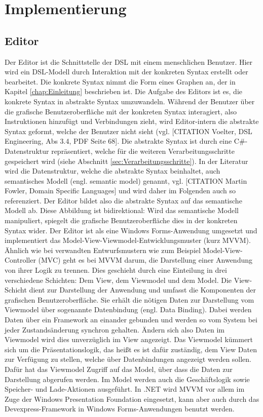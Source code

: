 \chapter{Implementierung}
\label{chap:Implementierung}

\section{Editor}
\label{sec:Editor}
Der Editor ist die Schnittstelle der DSL mit einem menschlichen Benutzer. Hier wird ein DSL-Modell durch Interaktion mit der konkreten Syntax erstellt oder bearbeitet. Die konkrete Syntax nimmt die Form eines Graphen an, der in Kapitel \ref{chap:Einleitung} beschrieben ist. Die Aufgabe des Editors ist es, die konkrete Syntax in abstrakte Syntax umzuwandeln. Während der Benutzer über die grafische Benutzeroberfläche mit der konkreten Syntax interagiert, also Instruktionen hinzufügt und Verbindungen zieht, wird Editor-intern die abstrakte Syntax geformt, welche der Benutzer nicht sieht (vgl. [CITATION Voelter, DSL Engineering, Abs 3.4, PDF Seite 68]. Die abstrakte Syntax ist durch eine C\#-Datenstruktur repräsentiert, welche für die weiteren Verarbeitungsschritte gespeichert wird (siehe Abschnitt \ref{sec:Verarbeitungsschritte}). In der Literatur wird die Datenstruktur, welche die abstrakte Syntax beinhaltet, auch semantisches Modell (engl. semantic model) genannt, vgl. [CITATION Martin Fowler, Domain Specific Languages] und wird daher im Folgenden auch so referenziert. Der Editor bildet also die abstrakte Syntax auf das semantische Modell ab. Diese Abbildung ist bidirektional: Wird das semantische Modell manipuliert, spiegelt die grafische Benutzeroberfläche dies in der konkreten Syntax wider.
\newline
Der Editor ist als eine Windows Forms-Anwendung umgesetzt und implementiert das Model-View-Viewmodel-Entwicklungsmuster (kurz MVVM). Ähnlich wie bei verwandten Entwurfsmustern wie zum Beispiel Model-View-Controller (MVC) geht es bei MVVM darum, die Darstellung einer Anwendung von ihrer Logik zu trennen. Dies geschieht durch eine Einteilung in drei verschiedene Schichten: Dem View, dem Viewmodel und dem Model. Die View-Schicht dient zur Darstellung der Anwendung und umfasst die Komponenten der grafischen Benutzeroberfläche. Sie erhält die nötigen Daten zur Darstellung vom Viewmodel über sogenannte Datenbindung (engl. Data Binding). Dabei werden Daten über ein Framework an einander gebunden und werden so vom System bei jeder Zustandsänderung synchron gehalten. Ändern sich also Daten im Viewmodel wird dies unverzüglich im View angezeigt. Das Viewmodel kümmert sich um die Präsentationslogik, das heißt es ist dafür zuständig, dem View Daten zur Verfügung zu stellen, welche über Datenbindungen angezeigt werden sollen. Dafür hat das Viewmodel Zugriff auf das Model, über dass die Daten zur Darstellung abgerufen werden. Im Model werden auch die Geschäftslogik sowie Speicher- und Lade-Aktionen ausgeführt. In .NET wird MVVM vor allem im Zuge der Windows Presentation Foundation eingesetzt, kann aber auch durch das Devexpress-Framework in Windows Forms-Anwendungen benutzt werden. 
